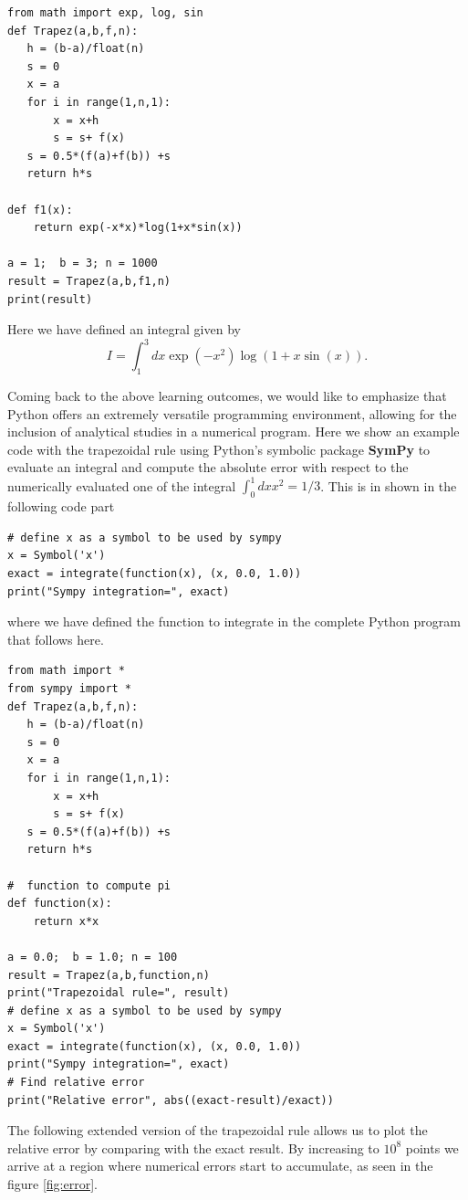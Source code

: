 \documentclass[graybox,envcountchap,sectrefs]{svmult}
\begin{document}
\begin{lstlisting}
from math import exp, log, sin
def Trapez(a,b,f,n):
   h = (b-a)/float(n)
   s = 0
   x = a
   for i in range(1,n,1):
       x = x+h
       s = s+ f(x)
   s = 0.5*(f(a)+f(b)) +s
   return h*s

def f1(x):
    return exp(-x*x)*log(1+x*sin(x))

a = 1;  b = 3; n = 1000
result = Trapez(a,b,f1,n)
print(result)
\end{lstlisting}
Here we have defined an integral given by
\[
I=\int_1^3 dx \exp{(-x^2)}\log{(1+x\sin{(x)})}.
\]


Coming back to the above learning outcomes, we would like to emphasize that
Python offers an  extremely versatile programming  environment, allowing for
the inclusion of analytical studies in a numerical program. Here we show an
example code with the trapezoidal rule using Python's symbolic package \textbf{SymPy} \cite{SymPy} to evaluate an integral and compute the absolute error
with respect to the numerically evaluated one of the integral
$\int_0^1 dx x^2 = 1/3$. This is in shown in the following code part
\begin{lstlisting}
# define x as a symbol to be used by sympy
x = Symbol('x')
exact = integrate(function(x), (x, 0.0, 1.0))
print("Sympy integration=", exact)
\end{lstlisting}
where we have defined the function to integrate in
the complete Python program that follows here.
\begin{lstlisting}
from math import *
from sympy import *
def Trapez(a,b,f,n):
   h = (b-a)/float(n)
   s = 0
   x = a
   for i in range(1,n,1):
       x = x+h
       s = s+ f(x)
   s = 0.5*(f(a)+f(b)) +s
   return h*s

#  function to compute pi
def function(x):
    return x*x

a = 0.0;  b = 1.0; n = 100
result = Trapez(a,b,function,n)
print("Trapezoidal rule=", result)
# define x as a symbol to be used by sympy
x = Symbol('x')
exact = integrate(function(x), (x, 0.0, 1.0))
print("Sympy integration=", exact)
# Find relative error
print("Relative error", abs((exact-result)/exact))
\end{lstlisting}
The following extended version of the trapezoidal rule allows us to
plot the relative error by comparing with the exact result. By
increasing to $10^8$ points we arrive at a region where numerical
errors start to accumulate, as seen in the figure \ref{fig:error}.
\end{document}
